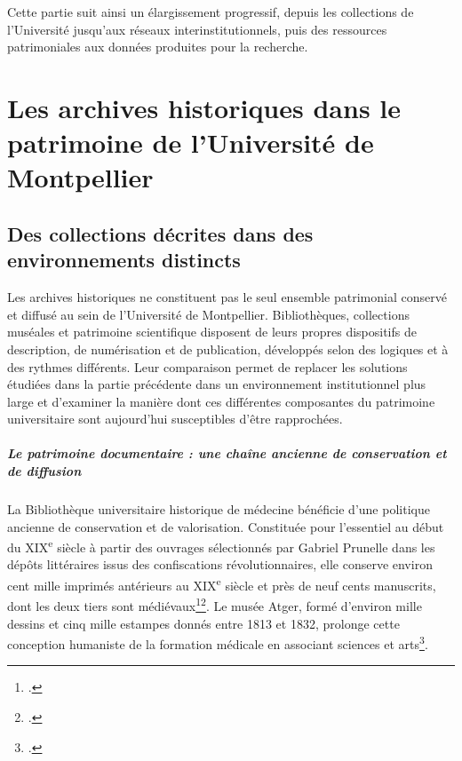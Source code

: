 Cette partie suit ainsi un élargissement progressif, depuis les collections de l'Université jusqu'aux réseaux interinstitutionnels, puis des ressources patrimoniales aux données produites pour la recherche.


\chapter{Les archives historiques dans le patrimoine de l'Université de Montpellier}


\section{Des collections décrites dans des environnements distincts}

Les archives historiques ne constituent pas le seul ensemble patrimonial conservé et diffusé au sein de l'Université de Montpellier. Bibliothèques, collections muséales et patrimoine scientifique disposent de leurs propres dispositifs de description, de numérisation et de publication, développés selon des logiques et à des rythmes différents. Leur comparaison permet de replacer les solutions étudiées dans la partie précédente dans un environnement institutionnel plus large et d'examiner la manière dont ces différentes composantes du patrimoine universitaire sont aujourd'hui susceptibles d'être rapprochées.

\paragraph{Le patrimoine documentaire : une chaîne ancienne de conservation et de diffusion}

La Bibliothèque universitaire historique de médecine bénéficie d'une politique ancienne de conservation et de valorisation. Constituée pour l'essentiel au début du XIX\textsuperscript{e} siècle à partir des ouvrages sélectionnés par Gabriel Prunelle dans les dépôts littéraires issus des confiscations révolutionnaires, elle conserve environ cent mille imprimés antérieurs au XIX\textsuperscript{e} siècle et près de neuf cents manuscrits, dont les deux tiers sont médiévaux\footcite{Dulieu1981}\footcite{Lorblanchet2015}. Le musée Atger, formé d'environ mille dessins et cinq mille estampes donnés entre 1813 et 1832, prolonge cette conception humaniste de la formation médicale en associant sciences et arts\footcite{Lorblanchet2015}.

